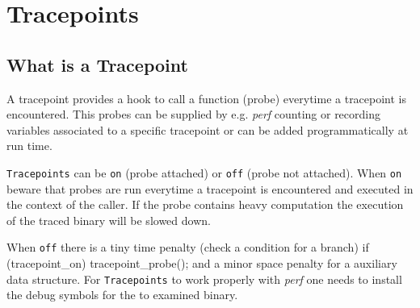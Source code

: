\chapter{Tracepoints}
\section{What is a Tracepoint}
A tracepoint provides a hook to call a function (probe) everytime a
tracepoint is encountered. This probes can be supplied by e.g.  {\em perf}
counting or recording variables associated to a specific tracepoint or
can be added programmatically at run time.

{\tt Tracepoints} can be {\tt on} (probe attached) or {\tt off} (probe not
attached).  When {\tt on} beware that probes are run everytime a
tracepoint is encountered and executed in the context of the
caller. If the probe contains heavy computation the execution of the
traced binary will be slowed down.

When {\tt off} there is a tiny time penalty (check a condition for a branch)
\starttyping
if (tracepoint_on) { tracepoint_probe(); }
\stoptyping
and a minor space penalty for a auxiliary data structure. For {\tt Tracepoints} to work properly with {\em perf} one needs to install the
debug symbols for the to examined binary.
